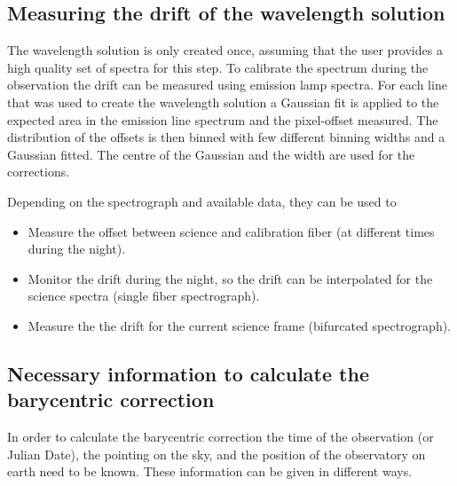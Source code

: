 \documentclass[10pt,a4paper]{article}
\begin{document}
\subsection{Measuring the drift of the wavelength solution}
The wavelength solution is only created once, assuming that the user provides a high quality set of spectra for this step. To calibrate the spectrum during the observation the drift can be measured using emission lamp spectra. For each line that was used to create the wavelength solution a Gaussian fit is applied to the expected area in the emission line spectrum and the pixel-offset measured. The distribution of the offsets is then binned with few different binning widths and a Gaussian fitted. The centre of the Gaussian and the width are used for the corrections.

Depending on the spectrograph and available data, they can be used to
\begin{itemize}
  \item Measure the offset between science and calibration fiber (at different times during the night).
  \item Monitor the drift during the night, so the drift can be interpolated for the science spectra (single fiber spectrograph).
  \item Measure the the drift for the current science frame (bifurcated spectrograph).
\end{itemize}


\subsection{Necessary information to calculate the barycentric correction}
\label{Section:barycentric_correction}
In order to calculate the barycentric correction the time of the observation (or Julian Date), the pointing on the sky, and the position of the observatory on earth need to be known. These information can be given in different ways. 
\end{document}
